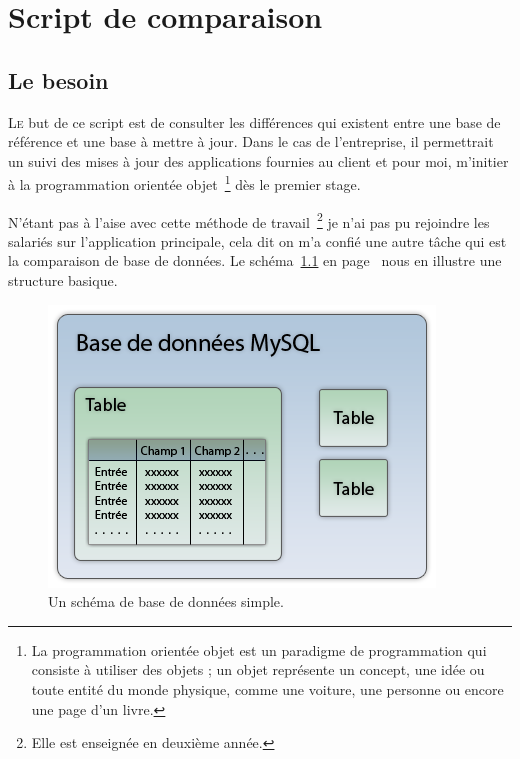 \chapter{Script de comparaison} %
\label{cha:Script de comparaison}

\section{Le besoin} %
\label{sec:Le besoin}

\lettrine{L}{e} but de ce script est de consulter les différences qui
existent entre une base de référence et une base à mettre à jour. Dans
le cas de l'entreprise, il permettrait un suivi des mises à jour des
applications fournies au client et pour moi, m'initier à la
programmation orientée objet\, \footnote{La programmation orientée objet
est un paradigme de programmation qui consiste à utiliser des objets ;
un objet représente un concept, une idée ou toute entité du monde
physique, comme une voiture, une personne ou encore une page d'un
livre.} dès le premier stage.

N'étant pas à l'aise avec cette méthode de travail\, \footnote{Elle est
enseignée en deuxième année.} je n'ai pas pu rejoindre les salariés sur
l'application principale, cela dit on m'a confié une autre tâche qui est
la comparaison de base de données. Le schéma~\ref{bdd} en
page~\pageref{bdd} nous en illustre une structure basique.

\begin{figure}
    \begin{center}
        \includegraphics[scale=0.7]{images/bdd.png}
        \caption{Un schéma de base de données simple.}
        \label{bdd}
    \end{center}
\end{figure}

